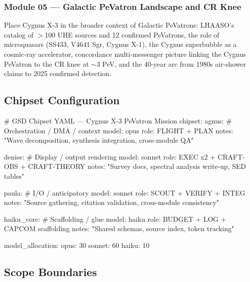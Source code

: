 \documentclass[11pt,letterpaper]{article}
\begin{document}
\subsubsection{Module 05 --- Galactic PeVatron Landscape and CR Knee}
Place Cygnus X-3 in the broader context of Galactic PeVatrons: LHAASO's catalog of $>$100 UHE sources and 12 confirmed PeVatrons, the role of microquasars (SS433, V4641 Sgr, Cygnus X-1), the Cygnus superbubble as a cosmic-ray accelerator, concordance multi-messenger picture linking the Cygnus PeVatron to the CR knee at $\sim$3 PeV, and the 40-year arc from 1980s air-shower claims to 2025 confirmed detection.

\subsection{Chipset Configuration}

\begin{asciibox}
# GSD Chipset YAML --- Cygnus X-3 PeVatron Mission
chipset:
  agnus:            # Orchestration / DMA / context
    model: opus
    role: FLIGHT + PLAN
    notes: "Wave decomposition, synthesis integration, cross-module QA"

  denise:           # Display / output rendering
    model: sonnet
    role: EXEC x2 + CRAFT-OBS + CRAFT-THEORY
    notes: "Survey docs, spectral analysis write-up, SED tables"

  paula:            # I/O / anticipatory
    model: sonnet
    role: SCOUT + VERIFY + INTEG
    notes: "Source gathering, citation validation, cross-module consistency"

  haiku_core:       # Scaffolding / glue
    model: haiku
    role: BUDGET + LOG + CAPCOM scaffolding
    notes: "Shared schemas, source index, token tracking"

model_allocation:
  opus:   30%
  sonnet: 60%
  haiku:  10%
\end{asciibox}

\subsection{Scope Boundaries}
\end{document}

